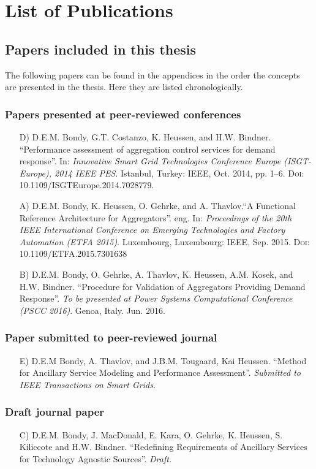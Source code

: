 \chapter{List of Publications}
\section*{Papers included in this thesis}
The following papers can be found in the appendices in the order the concepts are presented in the thesis. Here they are listed chronologically.
\subsection*{Papers presented at peer-reviewed conferences}
\begin{itemize}
	\item[D)] D.E.M. Bondy, G.T. Costanzo, K. Heussen, and H.W. Bindner. ``Performance assessment of aggregation control services for demand response''. In: \emph{Innovative Smart Grid Technologies Conference Europe (ISGT-Europe), 2014 IEEE PES}. Istanbul, Turkey: IEEE, Oct. 2014, pp. 1–6. \textsc{Doi}: 10.1109/ISGTEurope.2014.7028779.
	\item[A)] D.E.M. Bondy, K. Heussen, O. Gehrke, and A. Thavlov.``A Functional Reference Architecture for Aggregators''. eng. In: \emph{Proceedings of the 20th IEEE International Conference on Emerging Technologies and Factory Automation (ETFA 2015)}. Luxembourg, Luxembourg: IEEE, Sep. 2015. \textsc{Doi}: 10.1109/ETFA.2015.7301638
	\item[B)] D.E.M. Bondy, O. Gehrke, A. Thavlov, K. Heussen, A.M. Kosek, and H.W. Bindner. ``Procedure for Validation of Aggregators Providing Demand Response''. \emph{To be presented at Power Systems Computational Conference (PSCC 2016)}. Genoa, Italy. Jun. 2016.
\end{itemize}

\subsection*{Paper submitted to peer-reviewed journal}
\begin{itemize}
	\item[E)] D.E.M Bondy, A. Thavlov, and J.B.M. Tougaard, Kai Heussen. ``Method for Ancillary Service Modeling and Performance Assessment''. \emph{Submitted to IEEE Transactions on Smart Grids}.
\end{itemize}

\subsection*{Draft journal paper}
\begin{itemize}
\item[C)] D.E.M. Bondy, J. MacDonald, E. Kara, O. Gehrke, K. Heussen, S. Kiliccote and H.W. Bindner. ``Redefining Requirements of Ancillary Services for Technology Agnostic
	Sources''. \emph{Draft.}
\end{itemize}

